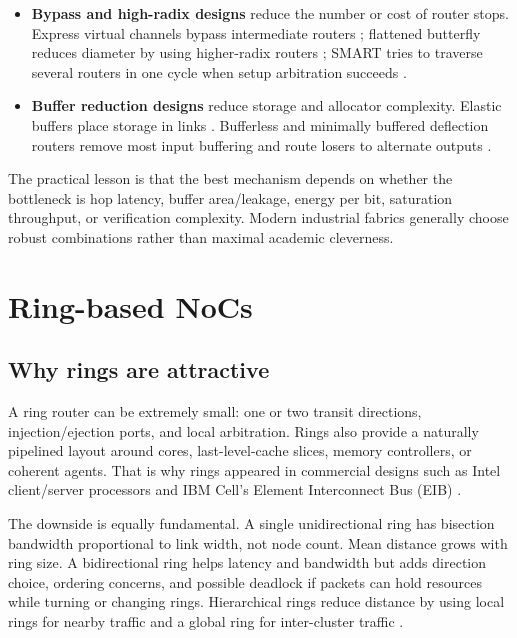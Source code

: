 \documentclass[11pt]{article}
\newcommand{\term}[1]{\textbf{#1}}
\begin{document}
\begin{itemize}
  \item \term{Bypass and high-radix designs} reduce the number or cost of router stops. Express virtual channels bypass intermediate routers \cite{Kumar2007EVC}; flattened butterfly reduces diameter by using higher-radix routers \cite{Kim2007Flattened}; SMART tries to traverse several routers in one cycle when setup arbitration succeeds \cite{Krishna2013SMART}.
  \item \term{Buffer reduction designs} reduce storage and allocator complexity. Elastic buffers place storage in links \cite{Michelogiannakis2009Elastic}. Bufferless and minimally buffered deflection routers remove most input buffering and route losers to alternate outputs \cite{Moscibroda2009,Michelogiannakis2010Bufferless,Fallin2011CHIPPER,Fallin2012MinBD}.
\end{itemize}

The practical lesson is that the best mechanism depends on whether the bottleneck is hop latency, buffer area/leakage, energy per bit, saturation throughput, or verification complexity. Modern industrial fabrics generally choose robust combinations rather than maximal academic cleverness.

\section{Ring-based NoCs}

\subsection{Why rings are attractive}

A ring router can be extremely small: one or two transit directions, injection/ejection ports, and local arbitration. Rings also provide a naturally pipelined layout around cores, last-level-cache slices, memory controllers, or coherent agents. That is why rings appeared in commercial designs such as Intel client/server processors and IBM Cell's Element Interconnect Bus (EIB) \cite{Kanter2010Sandy,Ainsworth2006Cell}.

The downside is equally fundamental. A single unidirectional ring has bisection bandwidth proportional to link width, not node count. Mean distance grows with ring size. A bidirectional ring helps latency and bandwidth but adds direction choice, ordering concerns, and possible deadlock if packets can hold resources while turning or changing rings. Hierarchical rings reduce distance by using local rings for nearby traffic and a global ring for inter-cluster traffic \cite{Ravindran1998HierRing,Das2009Hier,Ausavarungnirun2014HiRD}.
\end{document}
